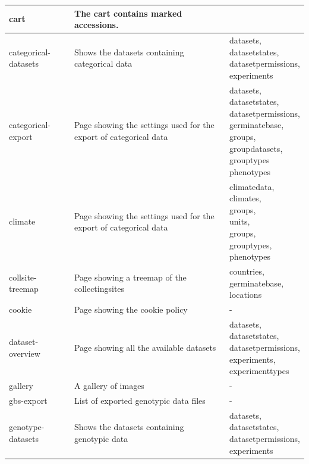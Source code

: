 \begin{longtable}{p{}p{}p{}}
	cart                   & The cart contains marked accessions. & \cellwrap{germinatebase} \\ \midrule
	categorical-datasets    & Shows the datasets containing categorical data & \cellwrap{datasets,\\datasetstates,\\datasetpermissions,\\experiments} \\ \midrule
	categorical-export      & Page showing the settings used for the export of categorical data & \cellwrap{datasets,\\datasetstates,\\datasetpermissions,\\germinatebase,\\groups,\\groupdatasets,\\grouptypes\\phenotypes} \\ \midrule
	climate                & Page showing the settings used for the export of categorical data & \cellwrap{climatedata,\\climates,\\groups,\\units,\\groups,\\grouptypes,\\phenotypes} \\ \midrule
	collsite-treemap        & Page showing a treemap of the collectingsites & \cellwrap{countries,\\germinatebase,\\locations} \\ \midrule
	cookie                 & Page showing the cookie policy & - \\ \midrule
	dataset-overview       & Page showing all the available datasets & \cellwrap{datasets,\\datasetstates,\\datasetpermissions,\\experiments,\\experimenttypes} \\ \midrule
	gallery                & A gallery of images & - \\ \midrule
	gbs-export              & List of exported genotypic data files & - \\ \midrule
	genotype-datasets       & Shows the datasets containing genotypic data & \cellwrap{datasets,\\datasetstates,\\datasetpermissions,\\experiments} \\ \midrule

\end{longtable}
